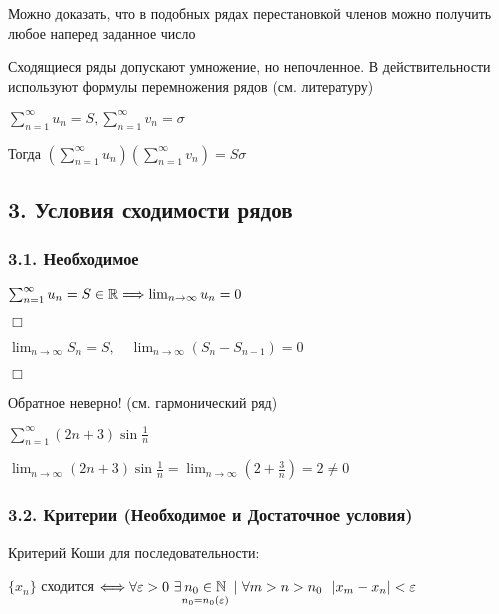 \documentclass[12pt]{article}
\begin{document}
    \Notas Можно доказать, что в подобных рядах перестановкой членов можно получить любое наперед заданное число

    \Notas Сходящиеся ряды допускают умножение, но непочленное. В действительности используют формулы перемножения рядов (см. литературу)

    $\sum_{n = 1}^\infty u_n = S, \sum_{n = 1}^\infty v_n = \sigma$

    Тогда $\left(\sum_{n = 1}^\infty u_n\right)\left(\sum_{n = 1}^\infty v_n\right) = S\sigma$

    \mediumvspace

    \subsection{3. Условия сходимости рядов}

    \hypertarget{necessarycondition}{}

    \subsubsection{3.1. Необходимое}

    \begin{MyTheorem}
        \Ths $\sum_{n = 1}^\infty u_n = S \in \mathbb{R} \Longrightarrow \lim_{n \to \infty} u_n = 0$
    \end{MyTheorem}

    \begin{tcolorbox}
        $\Box$

        $\lim_{n \to \infty} S_n = S, \quad \lim_{n\to\infty} (S_n - S_{n - 1}) = 0$

        $\Box$
    \end{tcolorbox}

    \Nota Обратное неверно! (см. гармонический ряд)

    \Ex $\sum_{n = 1}^\infty (2n + 3) \sin \frac{1}{n}$

    $\lim_{n \to \infty} (2n + 3) \sin \frac{1}{n} = \lim_{n \to \infty} (2 + \frac{3}{n}) = 2 \neq 0$

    \subsubsection{3.2. Критерии (Необходимое и Достаточное условия)}

    \hypertarget{cauchycriteria}{}

    \Mem Критерий Коши для последовательности: 
    
    $\{x_n\}$ сходится $\Longleftrightarrow \forall \varepsilon > 0 \ \exists \underset{n_0 = n_0 (\varepsilon)}{n_0 \in \mathbb{N}} \ | \ \forall m > n > n_0 \ \ |x_m - x_n| < \varepsilon$
\end{document}
